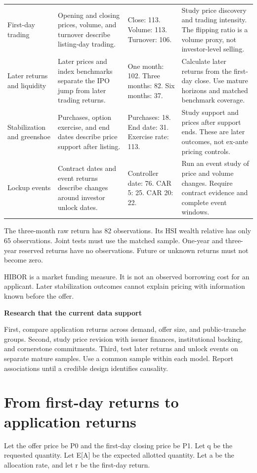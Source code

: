 \documentclass[10pt,a4paper]{article}
\begin{document}
{\begin{longtable}{@{}>{\raggedright\arraybackslash}p{2.5660cm}>{\raggedright\arraybackslash}p{4.2767cm}>{\raggedright\arraybackslash}p{3.0412cm}>{\raggedright\arraybackslash}p{6.2725cm}@{}}
First-day trading & Opening and closing prices, volume, and turnover describe listing-day trading. & Close: 113. Volume: 113. Turnover: 106. & Study price discovery and trading intensity. The flipping ratio is a volume proxy, not investor-level selling. \\
Later returns and liquidity & Later prices and index benchmarks separate the IPO jump from later trading returns. & One month: 102. Three months: 82. Six months: 37. & Calculate later returns from the first-day close. Use mature horizons and matched benchmark coverage. \\
Stabilization and greenshoe & Purchases, option exercise, and end dates describe price support after listing. & Purchases: 18. End date: 31. Exercise rate: 113. & Study support and prices after support ends. These are later outcomes, not ex-ante pricing controls. \\
Lockup events & Contract dates and event returns describe changes around investor unlock dates. & Controller date: 76. CAR 5: 25. CAR 20: 22. & Run an event study of price and volume changes. Require contract evidence and complete event windows. \\
\end{longtable}
}\par\addvspace{3pt}
The three-month raw return has 82 observations. Its HSI wealth relative has only 65 observations. Joint tests must use the matched sample. One-year and three-year reserved returns have no observations. Future or unknown returns must not become zero.


HIBOR is a market funding measure. It is not an observed borrowing cost for an applicant. Later stabilization outcomes cannot explain pricing with information known before the offer.


\par\addvspace{4pt}\textbf{Research that the current data support}\par\nobreak
First, compare application returns across demand, offer size, and public-tranche groups. Second, study price revision with issuer finances, institutional backing, and cornerstone commitments. Third, test later returns and unlock events on separate mature samples. Use a common sample within each model. Report associations until a credible design identifies causality.


\section*{From first-day returns to application returns}
Let the offer price be P0 and the first-day closing price be P1. Let q be the requested quantity. Let E[A] be the expected allotted quantity. Let a be the allocation rate, and let r be the first-day return.
\end{document}
